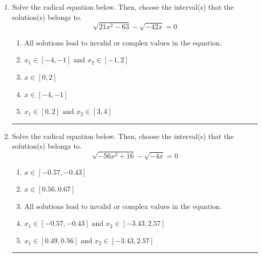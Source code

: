 \documentclass[14pt]{extbook}
\newcommand{\litem}[1]{\item#1\hspace*{-1cm}\rule{\textwidth}{0.4pt}}
\begin{document}
\begin{enumerate}
\litem{
Solve the radical equation below. Then, choose the interval(s) that the solution(s) belongs to.\[ \sqrt{21 x^2 - 63} - \sqrt{-42 x} = 0 \]\begin{enumerate}[label=\Alph*.]
\item \( \text{All solutions lead to invalid or complex values in the equation.} \)
\item \( x_1 \in [-4, -1] \text{ and } x_2 \in [-1,2] \)
\item \( x \in [0,2] \)
\item \( x \in [-4,-1] \)
\item \( x_1 \in [0, 2] \text{ and } x_2 \in [3,4] \)

\end{enumerate} }
\litem{
Solve the radical equation below. Then, choose the interval(s) that the solution(s) belongs to.\[ \sqrt{-56 x^2 + 16} - \sqrt{-4 x} = 0 \]\begin{enumerate}[label=\Alph*.]
\item \( x \in [-0.57,-0.43] \)
\item \( x \in [0.56,0.67] \)
\item \( \text{All solutions lead to invalid or complex values in the equation.} \)
\item \( x_1 \in [-0.57, -0.43] \text{ and } x_2 \in [-3.43,2.57] \)
\item \( x_1 \in [0.49, 0.56] \text{ and } x_2 \in [-3.43,2.57] \)


\end{enumerate}}
\end{enumerate}
\end{document}

